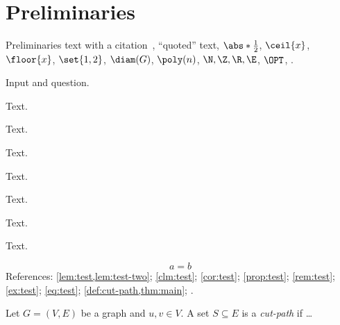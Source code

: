 \section{Preliminaries}
\label{sec:preliminaries}

Preliminaries text with a citation~\cite{Dummy2026}, \enquote{quoted} text, $\abs*{\frac{1}{2}}$, $\ceil{x}$, $\floor{x}$, $\set{1, 2}$, $\diam(G)$, $\poly(n)$, $\N, \Z, \R, \E$, $\OPT$, .

\begin{problem}
Input and question.
\end{problem}

\begin{lemma}\label{lem:test}Text.\end{lemma}
\begin{lemma}\label{lem:test-two}Text.\end{lemma}
\begin{claim}\label{clm:test}Text.\end{claim}
\begin{corollary}\label{cor:test}Text.\end{corollary}
\begin{proposition}\label{prop:test}Text.\end{proposition}
\begin{remark}\label{rem:test}Text.\end{remark}
\begin{example}\label{ex:test}Text.\end{example}
\begin{equation}\label{eq:test} a = b \end{equation}
References: \cref{lem:test,lem:test-two}; \cref{clm:test}; \cref{cor:test}; \cref{prop:test}; \cref{rem:test}; \cref{ex:test}; \cref{eq:test}; \cref{def:cut-path,thm:main}; .


\begin{definition}
\label{def:cut-path}
Let $G = (V, E)$ be a graph and $u, v \in V$.
A set $S \subseteq E$ is a \emph{cut-path} if \dots
\end{definition}

